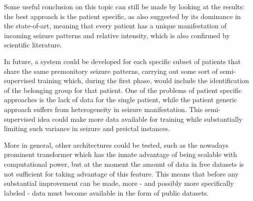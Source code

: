 Some useful conclusion on this topic can still be made by looking at the results: the best approach is the patient specific, as also suggested by its dominance in the state-of-art, meaning that every patient has a unique manifestation of incoming seizure patterns and relative intensity, which is also confirmed by scientific literature.

In future, a system could be developed for each specific subset of patients that share the same premonitory seizure patterns, carrying out some sort of semi-supervised training which, during the first phase, would include the identification of the belonging group for that patient. One of the problems of patient specific approaches is the lack of data for the single patient, while the patient generic approach suffers from heterogeneity in seizure manifestation. This semi-supervised idea could make more data available for training while substantially limiting such variance in seizure and preictal instances.

More in general, other architectures could be tested, such as the nowadays prominent transformer which has the innate advantage of being scalable with computational power, but at the moment the amount of data in free datasets is not sufficient for taking advantage of this feature. This means that before any substantial improvement can be made, more - and possibly more specifically labeled - data must become available in the form of public datasets.